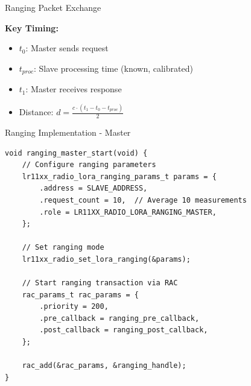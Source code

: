 \documentclass{beamer}
\begin{document}
\begin{frame}{Ranging Packet Exchange}
\begin{center}
\end{center}

\vspace{0.3cm}

\textbf{Key Timing:}
\begin{itemize}
    \item $t_0$: Master sends request
    \item $t_{proc}$: Slave processing time (known, calibrated)
    \item $t_1$: Master receives response
    \item Distance: $d = \frac{c \cdot (t_1 - t_0 - t_{proc})}{2}$
\end{itemize}
\end{frame}

\begin{frame}[fragile]{Ranging Implementation - Master}
\begin{lstlisting}[caption={Initiate Ranging Request (Master)}]
void ranging_master_start(void) {
    // Configure ranging parameters
    lr11xx_radio_lora_ranging_params_t params = {
        .address = SLAVE_ADDRESS,
        .request_count = 10,  // Average 10 measurements
        .role = LR11XX_RADIO_LORA_RANGING_MASTER,
    };

    // Set ranging mode
    lr11xx_radio_set_lora_ranging(&params);

    // Start ranging transaction via RAC
    rac_params_t rac_params = {
        .priority = 200,
        .pre_callback = ranging_pre_callback,
        .post_callback = ranging_post_callback,
    };

    rac_add(&rac_params, &ranging_handle);
}
\end{lstlisting}
\end{frame}
\end{document}
